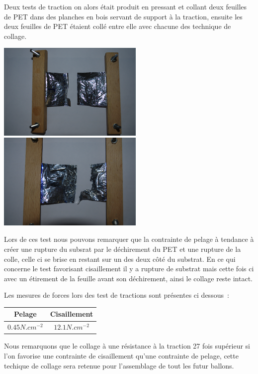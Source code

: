 \documentclass[a4paper,11pt]{article}
\begin{document}
Deux tests de traction on alors était produit en pressant et collant deux feuilles de PET dans des planches en bois servant de support à la traction, ensuite les deux feuilles de PET étaient collé entre elle avec chacune des technique de collage.

\begin{center}
 \includegraphics[width=7cm]{../Images/test_pelage.png}
 \includegraphics[width=7cm]{../Images/test_cisaillement.png}
\end{center}

Lors de ces test nous pouvons remarquer que la contrainte de pelage à tendance à créer une rupture du subsrat par le déchirement du PET et une rupture de la colle, celle ci se brise en restant sur un des deux côté du substrat.
En ce qui concerne le test favorisant cisaillement il y a rupture de substrat mais cette fois ci avec un étirement de la feuille avant son déchirement, ainsi le collage reste intact.

Les mesures de forces lors des test de tractions sont présentes ci dessous~:

\begin{center}
  \begin{tabular}{|c|c|}
    \hline
    Pelage & Cisaillement \\
    \hline
    $0.45 N.cm^{-2}$ & $12.1 N.cm^{-2}$ \\
    \hline
  \end{tabular}
\end{center}

Nous remarquons que le collage à une résistance à la traction 27 fois supérieur si l'on favorise une contrainte de cisaillement qu'une contrainte de pelage, cette techique de collage sera retenue pour l'assemblage de tout les futur ballons.
\end{document}
